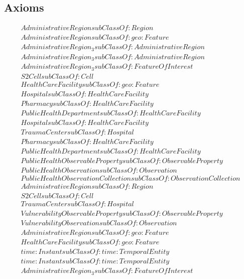 \subsection{Axioms}
\begin{align}
  AdministrativeRegion subClassOf: Region\\
  AdministrativeRegion subClassOf: geo:Feature\\
  AdministrativeRegion_3 subClassOf: AdministrativeRegion\\
  AdministrativeRegion_3 subClassOf: AdministrativeRegion\\
  AdministrativeRegion_3 subClassOf: FeatureOfInterest\\
  S2Cell subClassOf: Cell\\
  HealthCareFacility subClassOf: geo:Feature\\
  Hospital subClassOf: HealthCareFacility\\
  Pharmacy subClassOf: HealthCareFacility\\
  PublicHealthDepartment subClassOf: HealthCareFacility\\
  Hospital subClassOf: HealthCareFacility\\
  TraumaCenter subClassOf: Hospital\\
  Pharmacy subClassOf: HealthCareFacility\\
  PublicHealthDepartment subClassOf: HealthCareFacility\\
  PublicHealthObservableProperty subClassOf: ObservableProperty\\
  PublicHealthObservation subClassOf: Observation\\
  PublicHealthObservationCollection subClassOf: ObservationCollection\\
  AdministrativeRegion subClassOf: Region\\
  S2Cell subClassOf: Cell\\
  TraumaCenter subClassOf: Hospital\\
  VulnerabilityObservableProperty subClassOf: ObservableProperty\\
  VulnerabilityObservation subClassOf: Observation\\
  AdministrativeRegion subClassOf: geo:Feature\\
  HealthCareFacility subClassOf: geo:Feature\\
  time:Instant subClassOf: time:TemporalEntity\\
  time:Instant subClassOf: time:TemporalEntity\\
  AdministrativeRegion_3 subClassOf: FeatureOfInterest\\

\end{align}
